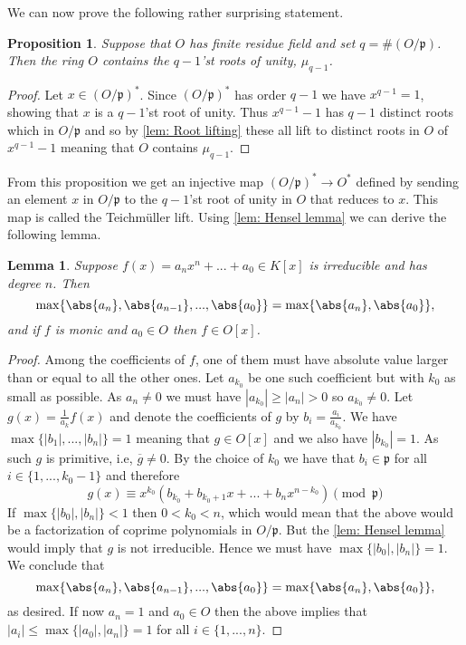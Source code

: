 \documentclass{article}
\newtheorem{proposition}{Proposition}[section]
\newtheorem{lemma}{Lemma}[section]
\newcommand{\mfrak}[1]{\mathfrak{#1}}
\numberwithin{equation}{section}
\begin{document}
We can now prove the following rather surprising statement.
\begin{proposition} \label{O contains q-1 roots of unity}
    Suppose that $O$ has finite residue field and set $q = \#(O/\mfrak p)$. Then the ring $O$ contains the $q-1$'st roots of unity, $\mu_{q-1}$.
\end{proposition}
\begin{proof}
    Let $x \in (O/\mfrak p)^*$. Since $(O/\mfrak p)^*$ has order $q-1$ we have $x^{q-1} = 1$, showing that $x$ is a $q-1$'st root of unity. Thus $x^{q-1} - 1$ has $q-1$ distinct roots which in $O/\mfrak p$ and so by \cref{lem: Root lifting} these all lift to distinct roots in $O$ of $x^{q-1} - 1$ meaning that $O$ contains $\mu_{q-1}$.
\end{proof}
From this proposition we get an injective map $(O / \mfrak p)^* \to O^*$ defined by sending an element $x$ in $O / \mfrak p$ to the $q-1$'st root of unity in $O$ that reduces to $x$. This map is called the Teichmüller lift. Using \cref{lem: Hensel lemma} we can derive the following lemma.
\begin{lemma}\label{lem: Sufficient condition for polynomial to have coefficients in valuation ring}
    Suppose $f(x) = a_n x^n + ... + a_0 \in K[x]$ is irreducible and has degree $n$. Then $$\max \{\abs{a_n}, \abs{a_{n-1}}, ..., \abs{a_0} \} = \max\{\abs{a_n}, \abs{a_0} \},$$
    and if $f$ is monic and $a_0 \in O$ then $f \in O[x]$.
\end{lemma}
\begin{proof}
    Among the coefficients of $f$, one of them must have absolute value larger than or equal to all the other ones. Let $a_{k_0}$ be one such coefficient but with $k_0$ as small as possible. As $a_n \neq 0$ we must have $|a_{k_0}| \geq |a_n| > 0$ so $a_{k_0} \neq 0$. Let $g(x) = \frac{1}{a_k}f(x)$ and denote the coefficients of $g$ by $b_i = \frac{a_i}{a_{k_0}}$. We have $\max \{|b_1|, ..., |b_n| \} = 1$ meaning that $g \in O[x]$ and we also have $|b_{k_0}| = 1$. As such $g$ is primitive, i.e, $\overline g \neq 0$. By the choice of $k_0$ we have that $b_i \in \mfrak p$ for all $i \in \{1, ..., k_0-1 \}$ and therefore
    $$g(x) \equiv x^{k_0}(b_{k_0} + b_{k_0+1} x+ ... + b_n x^{n - k_0}) \pmod {\mfrak p}$$
    If $\max\{|b_0|, |b_n| \} < 1$ then $0 < k_0 < n$, which would mean that the above would be a factorization of coprime polynomials in $O / \mfrak p$. But the \cref{lem: Hensel lemma} would imply that $g$ is not irreducible. Hence we must have $\max\{|b_0|, |b_n| \} = 1$. We conclude that 
    $$\max \{\abs{a_n}, \abs{a_{n-1}}, ..., \abs{a_0} \} = \max\{\abs{a_n}, \abs{a_0} \},$$
    as desired. If now $a_n = 1$ and $a_0 \in O$ then the above implies that $|a_i| \leq \max\{|a_0|, |a_n|\} = 1$ for all $i \in \{1, ..., n \}$. 
    
    

\end{proof}
\end{document}
